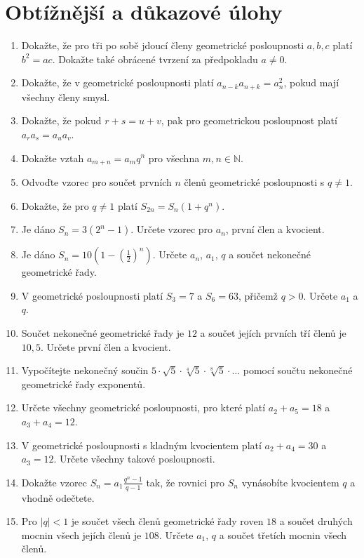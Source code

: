 \documentclass[12pt,a4paper]{article}
\begin{document}
\section*{Obtížnější a důkazové úlohy}
\begin{enumerate}[label=\arabic*.,start=86]
    \item Dokažte, že pro tři po sobě jdoucí členy geometrické posloupnosti $a,b,c$ platí $b^2=ac$. Dokažte také obrácené tvrzení za předpokladu $a\neq0$.
    \item Dokažte, že v geometrické posloupnosti platí $a_{n-k}a_{n+k}=a_n^2$, pokud mají všechny členy smysl.
    \item Dokažte, že pokud $r+s=u+v$, pak pro geometrickou posloupnost platí $a_ra_s=a_ua_v$.
    \item Dokažte vztah $a_{m+n}=a_mq^n$ pro všechna $m,n\in\mathbb N$.
    \item Odvoďte vzorec pro součet prvních $n$ členů geometrické posloupnosti s $q\neq1$.
    \item Dokažte, že pro $q\neq1$ platí $S_{2n}=S_n(1+q^n)$.
    \item Je dáno $S_n=3(2^n-1)$. Určete vzorec pro $a_n$, první člen a kvocient.
    \item Je dáno $S_n=10\left(1-\left(\frac12\right)^n\right)$. Určete $a_n$, $a_1$, $q$ a součet nekonečné geometrické řady.
    \item V geometrické posloupnosti platí $S_3=7$ a $S_6=63$, přičemž $q>0$. Určete $a_1$ a $q$.
    \item Součet nekonečné geometrické řady je $12$ a součet jejích prvních tří členů je $10{,}5$. Určete první člen a kvocient.
    \item Vypočítejte nekonečný součin $5\cdot\sqrt5\cdot\sqrt[4]{5}\cdot\sqrt[8]{5}\cdot\ldots$ pomocí součtu nekonečné geometrické řady exponentů.
    \item Určete všechny geometrické posloupnosti, pro které platí $a_2+a_5=18$ a $a_3+a_4=12$.
    \item V geometrické posloupnosti s kladným kvocientem platí $a_2+a_4=30$ a $a_3=12$. Určete všechny takové posloupnosti.
    \item Dokažte vzorec $S_n=a_1\frac{q^n-1}{q-1}$ tak, že rovnici pro $S_n$ vynásobíte kvocientem $q$ a vhodně odečtete.
    \item Pro $|q|<1$ je součet všech členů geometrické řady roven $18$ a součet druhých mocnin všech jejích členů je $108$. Určete $a_1$, $q$ a součet třetích mocnin všech členů.
\end{enumerate}
\end{document}
